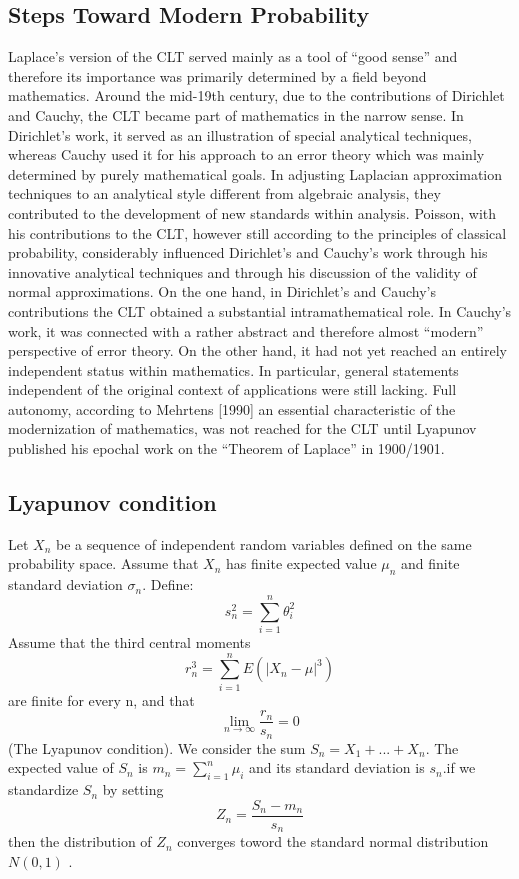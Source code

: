 \documentclass{article}
\begin{document}
\subsection{Steps Toward Modern Probability}


Laplace’s version of the CLT served mainly as a tool of “good sense” and therefore its importance was primarily determined by a field beyond mathematics. Around the mid-19th century, due to the contributions of Dirichlet and Cauchy, the CLT became part of mathematics in the narrow sense. In Dirichlet’s work, it served as an illustration of special analytical techniques, whereas Cauchy used it for his approach to an error theory which was mainly determined by purely mathematical goals. In adjusting Laplacian approximation techniques to an analytical style different from algebraic analysis, they contributed to the development of new standards within analysis. Poisson, with his contributions to the CLT, however still according to the principles of classical probability, considerably influenced Dirichlet’s and Cauchy’s work through his innovative analytical techniques and through his discussion of the validity of normal approximations.
On the one hand, in Dirichlet’s and Cauchy’s contributions the CLT obtained a substantial intramathematical role. In Cauchy’s work, it was connected with a rather abstract and therefore almost “modern” perspective of error theory. On the other hand, it had not yet reached an entirely independent status within mathematics. In particular, general statements independent of the original context of applications were still lacking. Full autonomy, according to Mehrtens [1990] an essential characteristic of the modernization of mathematics, was not reached for the CLT until Lyapunov published his epochal work on the “Theorem of Laplace” in 1900/1901.
\subsection{Lyapunov condition}
Let $X_n$ be a sequence of independent random variables defined on the same probability space. Assume that $X_n$ has finite expected value $\mu_n$ and finite standard deviation $\sigma_n$. \cite{Tijms2007Understanding} 
Define:
\[s_n^2 = \sum_{i=1}^n \theta_i^2 \]
Assume that the third central moments
\[  r_n^3 = \sum_{i=1}^n E(|X_n -\mu|^3)  \]are finite for every n, and that
\[\lim_{n \rightarrow \infty} \frac{r_n}{s_n}=0 \]
(The Lyapunov condition). 
We  consider the sum $S_n=X_1 +...+X_n$. The expected value of $S_n$ is $m_n = \sum_{i=1}^n \mu_i  $ and its standard deviation is $s_n$.if we standardize $S_n$ by setting \[Z_n = \frac{S_n- m_n }{s_n}\] then the distribution of $Z_n$ converges toword the standard normal distribution $N(0,1)$ . 
\end{document}
